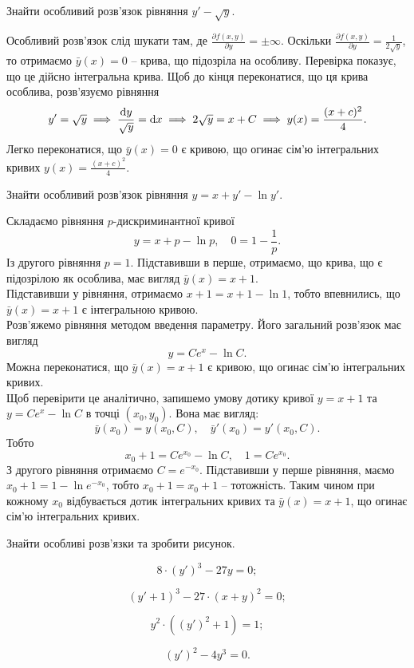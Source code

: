 \begin{example}
	Знайти особливий розв’язок рівняння $y' - \sqrt{y}$.
\end{example}
\begin{solution}
	Особливий розв’язок слід шукати там, де $\frac{\partial f(x,y)}{\partial y}=\pm\infty$. Оскільки $\frac{\partial f(x,y)}{\partial y}=\frac{1}{2\sqrt{y}}$, то отримаємо $\bar y(x)=0$ -- крива, що підозріла на особливу. Перевірка показує, що це дійсно інтегральна крива. Щоб до кінця переконатися, що ця крива особлива, розв’язуємо рівняння \[y'=\sqrt{y}\implies \frac{\mathop{}\!\mathrm{d} y}{\sqrt{y}}=\mathop{}\!\mathrm{d} x\implies 2\sqrt{y}=x+C\implies y(x)=\frac{(x+c)^2}{4}.\]
	Легко переконатися, що $\bar y(x)=0$ є кривою, що огинає сім’ю інтегральних кривих $y(x)=\frac{(x+c)^2}{4}$. 
\end{solution}

\begin{example}
	Знайти особливий розв’язок рівняння $y = x + y' - \ln y'$.
\end{example}
\begin{solution}
	Складаємо рівняння $p$-дискриминантної кривої \[ y = x + p - \ln p, \quad 0 = 1 - \frac{1}{p}.\] Із другого рівняння $p=1$. Підставивши в перше, отримаємо, що крива, що є підозрілою як особлива, має вигляд $\bar y(x)=x+1$. \\

	Підставивши у рівняння, отримаємо $x + 1=x+1-\ln 1$, тобто впевнились, що $\bar y(x)=x+1$ є інтегральною кривою. \\

	Розв’яжемо рівняння методом введення параметру. Його загальний розв’язок має вигляд \[y=Ce^x-\ln C.\] Можна переконатися, що $\bar y(x)=x+1$ є кривою, що огинає сім’ю інтегральних кривих. \\

	Щоб перевірити це аналітично, запишемо умову дотику кривої $y=x+1$ та $y=Ce^x-\ln C$ в точці $(x_0,y_0)$. Вона має вигляд: \[ \bar y(x_0) = y(x_0, C), \quad \bar{y}'(x_0) = y'(x_0,C).\] Тобто \[x_0+1=Ce^{x_0}-\ln C, \quad 1 = Ce^{x_0}.\] З другого рівняння отримаємо $C = e^{-x_0}$. Підставивши у перше рівняння, маємо $x_0 + 1 = 1 - \ln e^{-x_0}$, тобто $x_0+1=x_0+1$ -- тотожність. Таким чином при кожному $x_0$ відбувається дотик інтегральних кривих та $\bar y(x)=x+1$, що огинає сім’ю інтегральних кривих.
\end{solution}

Знайти особливі розв’язки та зробити рисунок.
\begin{multicols}{2}
\begin{problem}
	\[8\cdot(y')^3-27y=0;\]
\end{problem}
\begin{problem}
	\[(y'+1)^3-27\cdot(x+y)^2=0;\]
\end{problem}
\begin{problem}
	\[y^2\cdot((y')^2+1)=1;\]
\end{problem}
\begin{problem}
	\[(y')^2-4y^3=0.\]
\end{problem}
\end{multicols}